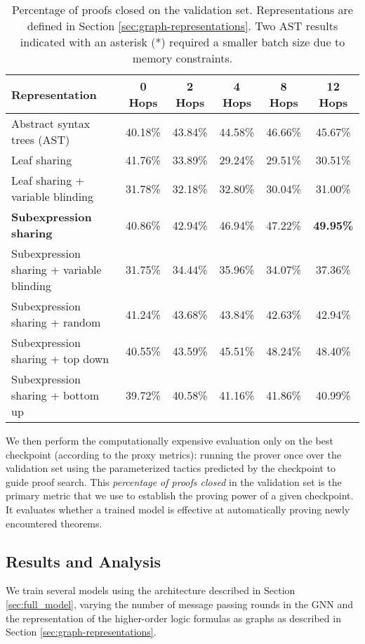 \documentclass[letterpaper]{article} \usepackage{aaai20}  \usepackage{times}  \usepackage{helvet} \usepackage{courier}  \usepackage[hyphens]{url}  \usepackage{graphicx} \urlstyle{rm} \def\UrlFont{\rm}  \usepackage{graphicx}  \frenchspacing  \setlength{\pdfpagewidth}{8.5in}  \setlength{\pdfpageheight}{11in}
\begin{document}
\begin{table*}[t]
\centering
\caption{Percentage of proofs closed on the validation set. Representations are defined in Section \ref{sec:graph-representations}. Two AST results indicated with an asterisk (*) required a smaller batch size due to memory constraints.}
    \begin{tabular}{lccccc}
    \hline
    {\bf Representation} & {\bf 0 Hops} & {\bf 2 Hops} & {\bf 4 Hops} & {\bf 8 Hops} & {\bf 12 Hops} \\
    \hline
    Abstract syntax trees (AST) & 40.18\% & 43.84\% & 44.58\% & 46.66\% & 45.67\% \\
    Leaf sharing & 41.76\% & 33.89\% & 29.24\% & 29.51\% & 30.51\% \\
    Leaf sharing + variable blinding & 31.78\% & 32.18\% & 32.80\% & 30.04\% & 31.00\% \\
    {\bf Subexpression sharing} & 40.86\% & 42.94\%& 46.94\%& 47.22\% & {\bf 49.95\%} \\
    Subexpression sharing + variable blinding & 31.75\% & 34.44\% & 35.96\% & 34.07\% & 37.36\% \\
    Subexpression sharing + random & 41.24\% & 43.68\% & 43.84\% & 42.63\% & 42.94\% \\
    Subexpression sharing + top down & 40.55\% & 43.59\% & 45.51\% & 48.24\% & 48.40\% \\
    Subexpression sharing + bottom up & 39.72\% & 40.58\% & 41.16\% & 41.86\% & 40.99\% \\
    \hline
    \end{tabular}
\label{tab:proofs-closed}
\end{table*}

We then perform the computationally expensive evaluation only on the best checkpoint (according to the proxy metrics): running the prover once over the validation set using the parameterized tactics predicted by the checkpoint to guide proof search. 
This {\it percentage of proofs closed} in the validation set is the primary metric that we use to establish the proving power of a given checkpoint.
It evaluates whether a trained model is effective at automatically proving newly encountered theorems.


\subsection{Results and Analysis}

We train several models using the architecture described in Section \ref{sec:full_model}, varying the number of message passing rounds in the GNN and the representation of the higher-order logic formulas as graphs as described in Section \ref{sec:graph-representations}.
\end{document}
